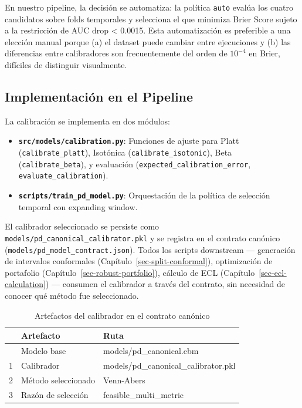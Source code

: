 \documentclass[
  spanish,
  11pt,
  letterpaper,
]{scrbook}
\providecommand{\tightlist}{%
  \setlength{\itemsep}{0pt}\setlength{\parskip}{0pt}}
\theoremstyle{plain}
\theoremstyle{remark}
\begin{document}
En nuestro pipeline, la decisión se automatiza: la política
\texttt{auto} evalúa los cuatro candidatos sobre folds temporales y
selecciona el que minimiza Brier Score sujeto a la restricción de AUC
drop \textless{} 0.0015. Esta automatización es preferible a una
elección manual porque (a) el dataset puede cambiar entre ejecuciones y
(b) las diferencias entre calibradores son frecuentemente del orden de
\(10^{-4}\) en Brier, difíciles de distinguir visualmente.

\subsection{Implementación en el
Pipeline}\label{implementaciuxf3n-en-el-pipeline}

La calibración se implementa en dos módulos:

\begin{itemize}
\tightlist
\item
  \textbf{\texttt{src/models/calibration.py}}: Funciones de ajuste para
  Platt (\texttt{calibrate\_platt}), Isotónica
  (\texttt{calibrate\_isotonic}), Beta (\texttt{calibrate\_beta}), y
  evaluación (\texttt{expected\_calibration\_error},
  \texttt{evaluate\_calibration}).
\item
  \textbf{\texttt{scripts/train\_pd\_model.py}}: Orquestación de la
  política de selección temporal con expanding window.
\end{itemize}

El calibrador seleccionado se persiste como
\texttt{models/pd\_canonical\_calibrator.pkl} y se registra en el
contrato canónico (\texttt{models/pd\_model\_contract.json}). Todos los
scripts downstream --- generación de intervalos conformales
(Capítulo~\ref{sec-split-conformal}), optimización de portafolio
(Capítulo~\ref{sec-robust-portfolio}), cálculo de ECL
(Capítulo~\ref{sec-ecl-calculation}) --- consumen el calibrador a través
del contrato, sin necesidad de conocer qué método fue seleccionado.

{

\begin{longtable}[]{@{}lll@{}}

\caption{\label{tbl-calibrator-contract}Artefactos del calibrador en el
contrato canónico}

\tabularnewline

\toprule\noalign{}
& Artefacto & Ruta \\
\midrule\noalign{}
\endhead
\bottomrule\noalign{}
\endlastfoot
0 & Modelo base & models/pd\_canonical.cbm \\
1 & Calibrador & models/pd\_canonical\_calibrator.pkl \\
2 & Método seleccionado & Venn-Abers \\
3 & Razón de selección & feasible\_multi\_metric \\

\end{longtable}

}
\end{document}
